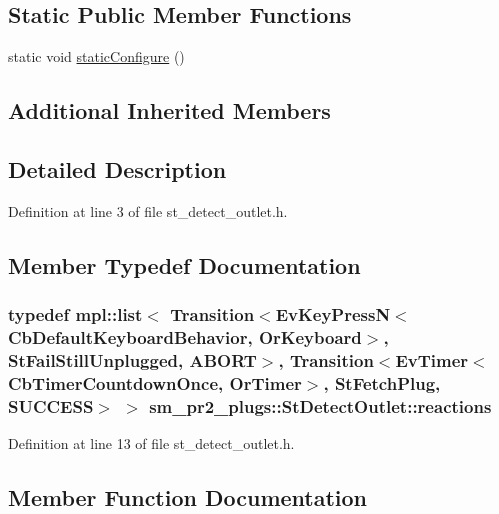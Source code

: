 \subsection*{Static Public Member Functions}
\begin{DoxyCompactItemize}
\item 
static void \hyperlink{structsm__pr2__plugs_1_1StDetectOutlet_afec8c7c7af071a426208a1a23f26a2bb}{static\+Configure} ()
\end{DoxyCompactItemize}
\subsection*{Additional Inherited Members}


\subsection{Detailed Description}


Definition at line 3 of file st\+\_\+detect\+\_\+outlet.\+h.



\subsection{Member Typedef Documentation}
\subsubsection[{\texorpdfstring{reactions}{reactions}}]{\setlength{\rightskip}{0pt plus 5cm}typedef mpl\+::list$<$ Transition$<$Ev\+Key\+PressN$<$Cb\+Default\+Keyboard\+Behavior, {\bf Or\+Keyboard}$>$, {\bf St\+Fail\+Still\+Unplugged}, {\bf A\+B\+O\+RT}$>$, Transition$<$Ev\+Timer$<$Cb\+Timer\+Countdown\+Once, {\bf Or\+Timer}$>$, {\bf St\+Fetch\+Plug}, {\bf S\+U\+C\+C\+E\+SS}$>$ $>$ {\bf sm\+\_\+pr2\+\_\+plugs\+::\+St\+Detect\+Outlet\+::reactions}}\hypertarget{structsm__pr2__plugs_1_1StDetectOutlet_a5d2a06136d75847c4f23be956d5c157a}{}\label{structsm__pr2__plugs_1_1StDetectOutlet_a5d2a06136d75847c4f23be956d5c157a}


Definition at line 13 of file st\+\_\+detect\+\_\+outlet.\+h.



\subsection{Member Function Documentation}
